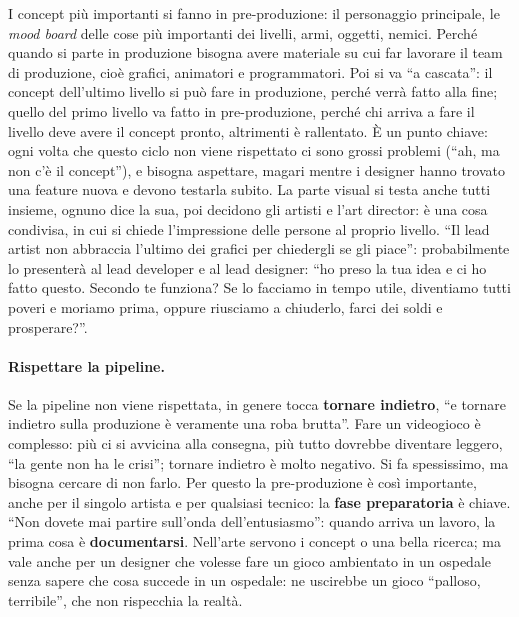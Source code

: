 I concept più importanti si fanno in pre-produzione: il personaggio principale,
le \emph{mood board} delle cose più importanti dei livelli, armi, oggetti,
nemici. Perché quando si parte in produzione bisogna avere materiale su cui far
lavorare il team di produzione, cioè grafici, animatori e programmatori. Poi si
va ``a cascata'': il concept dell'ultimo livello si può fare in produzione,
perché verrà fatto alla fine; quello del primo livello va fatto in
pre-produzione, perché chi arriva a fare il livello deve avere il concept
pronto, altrimenti è rallentato. È un punto chiave: ogni volta che questo ciclo
non viene rispettato ci sono grossi problemi (``ah, ma non c'è il concept''), e
bisogna aspettare, magari mentre i designer hanno trovato una feature nuova e
devono testarla subito. La parte visual si testa anche tutti insieme, ognuno
dice la sua, poi decidono gli artisti e l'art director: è una cosa condivisa, in
cui si chiede l'impressione delle persone al proprio livello. ``Il lead artist
non abbraccia l'ultimo dei grafici per chiedergli se gli piace'':
probabilmente lo presenterà al lead developer e al lead designer: ``ho preso la
tua idea e ci ho fatto questo. Secondo te funziona? Se lo facciamo in tempo
utile, diventiamo tutti poveri e moriamo prima, oppure riusciamo a chiuderlo,
farci dei soldi e prosperare?''.

\paragraph{Rispettare la pipeline.} Se la pipeline non viene rispettata, in
genere tocca \textbf{tornare indietro}, ``e tornare indietro sulla produzione è
veramente una roba brutta''. Fare un videogioco è complesso: più ci si avvicina
alla consegna, più tutto dovrebbe diventare leggero, ``la gente non ha le
crisi''; tornare indietro è molto negativo. Si fa spessissimo, ma bisogna cercare
di non farlo. Per questo la pre-produzione è così importante, anche per il
singolo artista e per qualsiasi tecnico: la \textbf{fase preparatoria} è chiave.
``Non dovete mai partire sull'onda dell'entusiasmo'': quando arriva un lavoro, la
prima cosa è \textbf{documentarsi}. Nell'arte servono i concept o una bella
ricerca; ma vale anche per un designer che volesse fare un gioco ambientato in
un ospedale senza sapere che cosa succede in un ospedale: ne uscirebbe un gioco
``palloso, terribile'', che non rispecchia la realtà.

